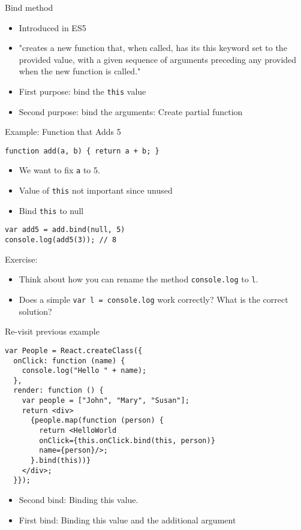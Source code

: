 \documentclass[presentation]{beamer}
\begin{document}
\begin{frame}[fragile,label=sec-12]{Bind method}
 \begin{itemize}
\item Introduced in ES5
\item "creates a new function that, when called, has its this keyword set to the
provided value, with a given sequence of arguments preceding any provided
when the new function is called."
\item First purpose: bind the \texttt{this} value
\item Second purpose: bind the arguments: Create \alert{partial} function
\end{itemize}
\end{frame}

\begin{frame}[fragile,label=sec-13]{Example: Function that Adds 5}
 \begin{verbatim}
function add(a, b) { return a + b; }
\end{verbatim}

\begin{itemize}
\item We want to fix \texttt{a} to 5.
\item Value of \texttt{this} not important since unused
\item Bind \texttt{this} to null
\end{itemize}

\begin{verbatim}
var add5 = add.bind(null, 5)
console.log(add5(3)); // 8
\end{verbatim}
\end{frame}


\begin{frame}[fragile,label=sec-14]{Exercise:}
 \begin{itemize}
\item Think about how you can rename the method \texttt{console.log} to \texttt{l}.
\item Does a simple \verb~var l = console.log~ work correctly? What is the correct
solution?
\end{itemize}
\end{frame}

\begin{frame}[fragile,label=sec-15]{Re-visit previous example}
 \begin{verbatim}
var People = React.createClass({
  onClick: function (name) {
    console.log("Hello " + name);
  },
  render: function () {
    var people = ["John", "Mary", "Susan"];
    return <div>
      {people.map(function (person) {
        return <HelloWorld
        onClick={this.onClick.bind(this, person)}
        name={person}/>;
      }.bind(this))}
    </div>;
  }});
\end{verbatim}

\begin{itemize}
\item Second bind: Binding this value.
\item First bind: Binding this value and the additional argument
\end{itemize}
\end{frame}
\end{document}
